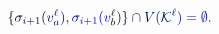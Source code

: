 \documentclass[12pt]{article}
\begin{document}
\makeatletter
\renewcommand*{\@textcolor}[3]{%
  \protect\leavevmode
  \begingroup
    \color#1{#2}#3%
  \endgroup
}
\makeatother
\begin{displaymath}
\mathcolor[RGB]{0,0,15}{\{} \mathcolor[RGB]{0,0,30}{\sigma} _ { \mathcolor[RGB]{0,0,45}{i} \mathcolor[RGB]{0,0,60}{+} \mathcolor[RGB]{0,0,75}{1} } \mathcolor[RGB]{0,0,90}{(} \mathcolor[RGB]{0,0,105}{v} _ { \mathcolor[RGB]{0,0,120}{a} } ^ { \mathcolor[RGB]{0,0,135}{\ell} } \mathcolor[RGB]{0,0,150}{)} \mathcolor[RGB]{0,0,165}{,} \mathcolor[RGB]{0,0,180}{\sigma} _ { \mathcolor[RGB]{0,0,195}{i} \mathcolor[RGB]{0,0,210}{+} \mathcolor[RGB]{0,0,225}{1} } \mathcolor[RGB]{0,0,240}{(} \mathcolor[RGB]{0,0,255}{v} _ { \mathcolor[RGB]{0,15,0}{b} } ^ { \mathcolor[RGB]{0,15,15}{\ell} } \mathcolor[RGB]{0,15,30}{)} \mathcolor[RGB]{0,15,45}{\}} \mathcolor[RGB]{0,15,60}{\cap} \mathcolor[RGB]{0,15,75}{V} \mathcolor[RGB]{0,15,90}{(} \mathcal { \mathcolor[RGB]{0,15,105}{K} } ^ { \mathcolor[RGB]{0,15,120}{\ell} } \mathcolor[RGB]{0,15,135}{)} \mathcolor[RGB]{0,15,150}{=} \mathcolor[RGB]{0,15,165}{\emptyset} \mathcolor[RGB]{0,15,180}{.}
\end{displaymath}
\end{document}
